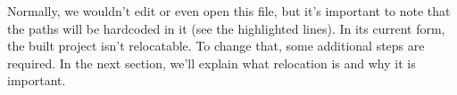 Normally, we wouldn’t edit or even open this file, but it’s important to note that the paths will be hardcoded in it (see the highlighted lines). In its current form, the built project isn’t relocatable. To change that, some additional steps are required. In the next section, we’ll explain what relocation is and why it is important.











































































